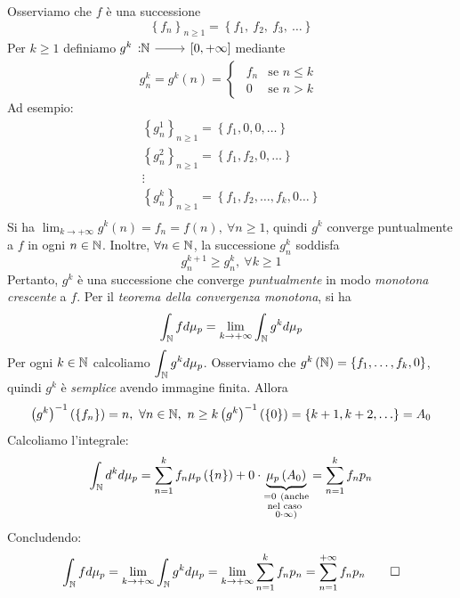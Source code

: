 \begin{demonstration}
	Osserviamo che $f$ è una successione
	\begin{equation*}
		\left\{f_n\right\}_{n\geq 1}=\left\{f_1,\ f_2,\ f_3,\ \ldots\right\}
	\end{equation*}
Per $k\geq 1$ definiamo $\funz{g^k}{\naturalset}{\left[0,+\infty\right]}$ mediante
\begin{equation*}
	g^k_n=g^k\left(n\right)=\begin{cases}
		\begin{array}{ll}
			f_n &\text{se }n\leq k\\
			0 &\text{se }n>k
		\end{array}
	\end{cases}
\end{equation*}
Ad esempio:
\begin{gather*}
	\left\{g^1_n\right\}_{n\geq 1}=\left\{f_1,0,0,\ldots\right\}\\
	\left\{g^2_n\right\}_{n\geq 1}=\left\{f_1,f_2,0,\ldots\right\}\\
	\vdots\\
	\left\{g^k_n\right\}_{n\geq 1}=\left\{f_1,f_2,\ldots,f_k,0\ldots\right\}\\
\end{gather*}
Si ha $\displaystyle\lim_{k\to+\infty}g^k\left(n\right)=f_n=f\left(n\right),\ \forall n\geq 1$, quindi $g^k$ converge puntualmente a $f$ in ogni $n\in\mathbb{N}$. Inoltre, $\forall n\in\mathbb{N}$, la successione $g^k_n$ soddisfa
\begin{equation*}
	g^{k+1}_n\geq g^k_n,\ \forall k\geq 1
\end{equation*}
Pertanto, $g^k$ è una successione che converge \textit{puntualmente} in modo \textit{monotona crescente} a $f$. Per il \textit{teorema della convergenza monotona}, si ha
\begin{equation*}
	\int_{\mathbb{N}}fd\mu_p=\lim_{k\to+\infty}\int_{\mathbb{N}}g^kd\mu_p
\end{equation*}
Per ogni $k\in\mathbb{N}$ calcoliamo $\displaystyle\int_{\mathbb{N}}g^kd\mu_p$. Osserviamo che $g^k\left(\mathbb{N}\right)=\left\{f_1,\ldots,f_k,0\right\}$, quindi $g^k$ è \textit{semplice} avendo immagine finita. Allora
\begin{equation*}
	\left(g^k\right)^{-1}\left(\left\{f_n\right\}\right)=n,\ \forall n\in\naturalset,\ n\geq k\\
	\left(g^k\right)^{-1}\left(\left\{0\right\}\right)=\left\{k+1,k+2,\ldots\right\}=A_0
\end{equation*}
Calcoliamo l'integrale:
\begin{equation*}
	\int_{\mathbb{N}}d^kd\mu_p=\sum_{n=1}^{k}f_n\mu_p\left(\left\{n\right\}\right)+0\cdot \underbrace{\mu_p\left(A_0\right)}_{\substack{=0\ (\text{anche} \\ \text{nel caso } \\ 0\cdot \infty)}}=\sum_{n=1}^{k}f_np_n
\end{equation*}
Concludendo:
\begin{equation*}
	\int_{\mathbb{N}}fd\mu_p=\lim_{k\to+\infty}\int_{\mathbb{N}}g^kd\mu_p=\lim_{k\to+\infty}\sum_{n=1}^{k}f_np_n=\sum_{n=1}^{+\infty}f_np_n\qedhere
\end{equation*}
\end{demonstration}
